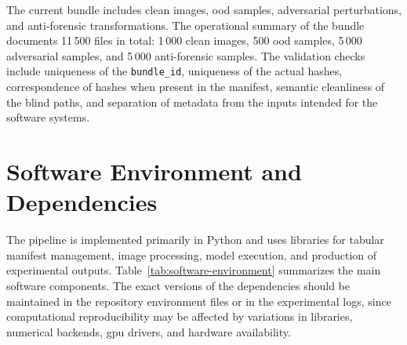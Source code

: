 The current bundle includes clean images, \gls{ood} samples, adversarial
perturbations, and anti-forensic transformations. The operational summary of the
bundle documents 11\,500 files in total: 1\,000 clean images, 500 \gls{ood}
samples, 5\,000 adversarial samples, and 5\,000 anti-forensic samples. The
validation checks include uniqueness of the \texttt{bundle\_id}, uniqueness of
the actual hashes, correspondence of hashes when present in the manifest,
semantic cleanliness of the blind paths, and separation of metadata from the
inputs intended for the software systems.


\section{Software Environment and Dependencies}
\label{app:software-environment}

The pipeline is implemented primarily in Python and uses libraries for tabular
manifest management, image processing, model execution, and production of
experimental outputs. Table~\ref{tab:software-environment} summarizes the main
software components. The exact versions of the dependencies should be maintained
in the repository environment files or in the experimental logs, since
computational reproducibility may be affected by variations in libraries,
numerical backends, \gls{gpu} drivers, and hardware availability.

